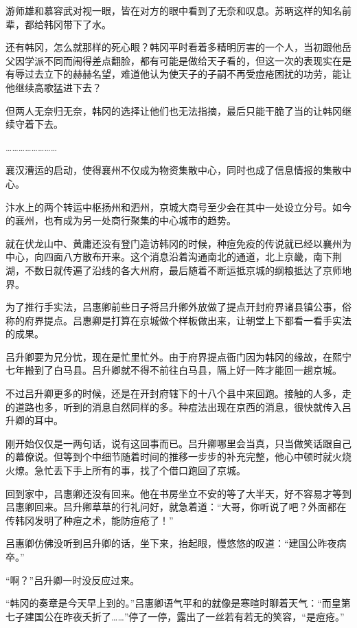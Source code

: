 游师雄和慕容武对视一眼，皆在对方的眼中看到了无奈和叹息。苏昞这样的知名前辈，都给韩冈带下了水。

还有韩冈，怎么就那样的死心眼？韩冈平时看着多精明厉害的一个人，当初跟他岳父因学派不同而闹得差点翻脸，都有可能是做给天子看的，但这一次的表现实在是有辱过去立下的赫赫名望，难道他认为使天子的子嗣不再受痘疮困扰的功劳，能让他继续高歌猛进下去？

但两人无奈归无奈，韩冈的选择让他们也无法指摘，最后只能干脆了当的让韩冈继续守着下去。

……………………

襄汉漕运的启动，使得襄州不仅成为物资集散中心，同时也成了信息情报的集散中心。

汴水上的两个转运中枢扬州和泗州，京城大商号至少会在其中一处设立分号。如今的襄州，也有成为另一处商行聚集的中心城市的趋势。

就在伏龙山中、黄庸还没有登门造访韩冈的时候，种痘免疫的传说就已经以襄州为中心，向四面八方散布开来。这个消息沿着沟通南北的通道，北上京畿，南下荆湖，不数日就传遍了沿线的各大州府，最后随着不断运抵京城的纲粮抵达了京师地界。

为了推行手实法，吕惠卿前些日子将吕升卿外放做了提点开封府界诸县镇公事，俗称的府界提点。吕惠卿是打算在京城做个样板做出来，让朝堂上下都看一看手实法的成果。

吕升卿要为兄分忧，现在是忙里忙外。由于府界提点衙门因为韩冈的缘故，在熙宁七年搬到了白马县。吕升卿就不得不前往白马县，隔上好一阵才能回一趟京城。

不过吕升卿更多的时候，还是在开封府辖下的十八个县中来回跑。接触的人多，走的道路也多，听到的消息自然同样的多。种痘法出现在京西的消息，很快就传入吕升卿的耳中。

刚开始仅仅是一两句话，说有这回事而已。吕升卿哪里会当真，只当做笑话跟自己的幕僚说。但等到个中细节随着时间的推移一步步的补充完整，他心中顿时就火烧火燎。急忙丢下手上所有的事，找了个借口跑回了京城。

回到家中，吕惠卿还没有回来。他在书房坐立不安的等了大半天，好不容易才等到吕惠卿回来。吕升卿草草的行礼问好，就急着道：“大哥，你听说了吧？外面都在传韩冈发明了种痘之术，能防痘疮了！”

吕惠卿仿佛没听到吕升卿的话，坐下来，抬起眼，慢悠悠的叹道：“建国公昨夜病卒。”

“啊？”吕升卿一时没反应过来。

“韩冈的奏章是今天早上到的。”吕惠卿语气平和的就像是寒暄时聊着天气：“而皇第七子建国公在昨夜夭折了……”停了一停，露出了一丝若有若无的笑容，“是痘疮。”

